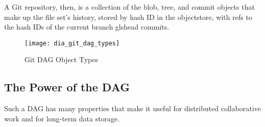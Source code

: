 A Git \gls{repository}, then, is a collection of the \gls{blob}, \gls{tree}, and
\gls{commit} objects that make up the file set's history, stored by hash ID in
the \gls{objectstore}, with \glspl{ref} to the hash IDs of the current
\gls{branch} gls{head} \glspl{commit}\cite{git_initial_readme}.

\begin{figure}[]
    \centering
        \texttt{[image: dia\_git\_dag\_types]}
    \caption{Git DAG Object Types}
    \label{dia_git_dag_types}
\end{figure}


%

\subsection{The Power of the DAG}

Such a \gls{DAG} has many properties that make it useful for distributed
collaborative work and for long-term data storage.


